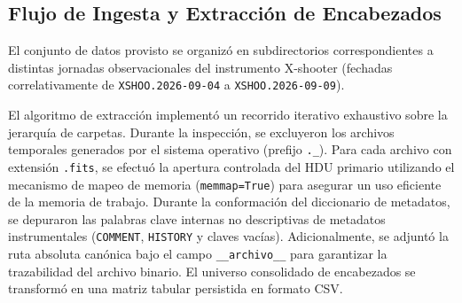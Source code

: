 \documentclass[10pt]{article}
\begin{document}
\subsection{Flujo de Ingesta y Extracción de Encabezados}
El conjunto de datos provisto se organizó en subdirectorios correspondientes a distintas jornadas observacionales del instrumento X-shooter (fechadas correlativamente de \texttt{XSHOO.2026-09-04} a \texttt{XSHOO.2026-09-09}). 

El algoritmo de extracción implementó un recorrido iterativo exhaustivo sobre la jerarquía de carpetas. Durante la inspección, se excluyeron los archivos temporales generados por el sistema operativo (prefijo \texttt{.\_}). Para cada archivo con extensión \texttt{.fits}, se efectuó la apertura controlada del HDU primario utilizando el mecanismo de mapeo de memoria (\texttt{memmap=True}) para asegurar un uso eficiente de la memoria de trabajo. Durante la conformación del diccionario de metadatos, se depuraron las palabras clave internas no descriptivas de metadatos instrumentales (\texttt{COMMENT}, \texttt{HISTORY} y claves vacías). Adicionalmente, se adjuntó la ruta absoluta canónica bajo el campo \texttt{\_\_archivo\_\_} para garantizar la trazabilidad del archivo binario. El universo consolidado de encabezados se transformó en una matriz tabular persistida en formato CSV.
\end{document}
